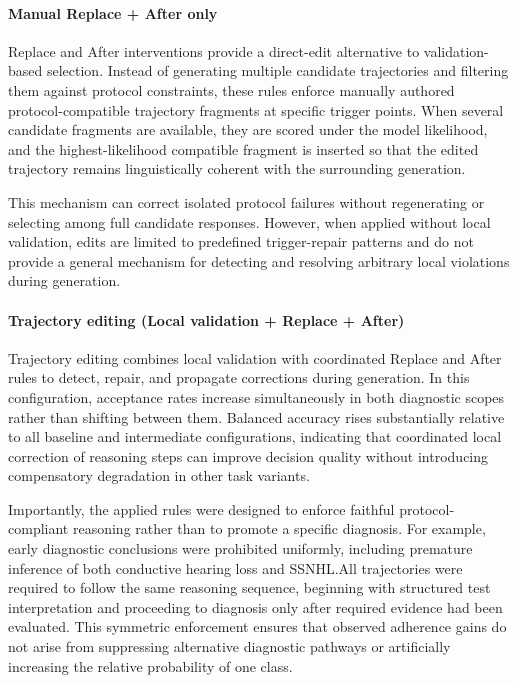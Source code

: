 \documentclass[twocolumn]{article}
\begin{document}
\paragraph{Manual Replace + After only}

Replace and After interventions provide a direct-edit alternative to
validation-based selection. Instead of generating multiple candidate
trajectories and filtering them against protocol constraints, these rules
enforce manually authored protocol-compatible trajectory fragments at specific
trigger points. When several candidate fragments are available, they are scored
under the model likelihood, and the highest-likelihood compatible fragment is
inserted so that the edited trajectory remains linguistically coherent with the
surrounding generation.

This mechanism can correct isolated protocol failures without regenerating or
selecting among full candidate responses. However, when applied without local
validation, edits are limited to predefined trigger-repair patterns and do not
provide a general mechanism for detecting and resolving arbitrary local
violations during generation.

\paragraph{Trajectory editing (Local validation + Replace + After)}

Trajectory editing combines local validation with coordinated Replace and After
rules to detect, repair, and propagate corrections during generation. In this
configuration, acceptance rates increase simultaneously in both diagnostic
scopes rather than shifting between them. Balanced accuracy rises substantially
relative to all baseline and intermediate configurations, indicating that
coordinated local correction of reasoning steps can improve decision quality
without introducing compensatory degradation in other task variants.

Importantly, the applied rules were designed to enforce faithful
protocol-compliant reasoning rather than to promote a specific diagnosis. For
example, early diagnostic conclusions were prohibited uniformly, including
premature inference of both conductive hearing loss and SSNHL.\@ All
trajectories were required to follow the same reasoning sequence, beginning with
structured test interpretation and proceeding to diagnosis only after required
evidence had been evaluated. This symmetric enforcement ensures that observed
adherence gains do not arise from suppressing alternative diagnostic pathways or
artificially increasing the relative probability of one class.
\end{document}
